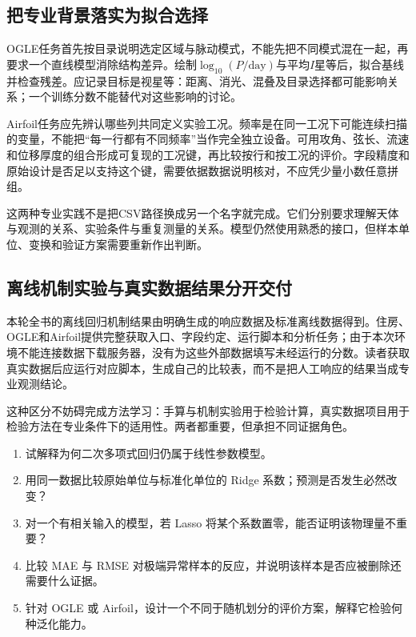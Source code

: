 
\subsection{把专业背景落实为拟合选择}
OGLE任务首先按目录说明选定区域与脉动模式，不能先把不同模式混在一起，再要求一个直线模型消除结构差异。绘制$\log_{10}(P/\mathrm{day})$与平均$I$星等后，拟合基线并检查残差。应记录目标是视星等：距离、消光、混叠及目录选择都可能影响关系；一个训练分数不能替代对这些影响的讨论。

Airfoil任务应先辨认哪些列共同定义实验工况。频率是在同一工况下可能连续扫描的变量，不能把“每一行都有不同频率”当作完全独立设备。可用攻角、弦长、流速和位移厚度的组合形成可复现的工况键，再比较按行和按工况的评价。字段精度和原始设计是否足以支持这个键，需要依据数据说明核对，不应凭少量小数任意拼组。

这两种专业实践不是把CSV路径换成另一个名字就完成。它们分别要求理解天体与观测的关系、实验条件与重复测量的关系。模型仍然使用熟悉的接口，但样本单位、变换和验证方案需要重新作出判断。

\subsection{离线机制实验与真实数据结果分开交付}
本轮全书的离线回归机制结果由明确生成的响应数据及标准离线数据得到。住房、OGLE和Airfoil提供完整获取入口、字段约定、运行脚本和分析任务；由于本次环境不能连接数据下载服务器，没有为这些外部数据填写未经运行的分数。读者获取真实数据后应运行对应脚本，生成自己的比较表，而不是把人工响应的结果当成专业观测结论。

这种区分不妨碍完成方法学习：手算与机制实验用于检验计算，真实数据项目用于检验方法在专业条件下的适用性。两者都重要，但承担不同证据角色。

\chapterexercise
\begin{enumerate}
\item 试解释为何二次多项式回归仍属于线性参数模型。
\item 用同一数据比较原始单位与标准化单位的 Ridge 系数；预测是否发生必然改变？
\item 对一个有相关输入的模型，若 Lasso 将某个系数置零，能否证明该物理量不重要？
\item 比较 MAE 与 RMSE 对极端异常样本的反应，并说明该样本是否应被删除还需要什么证据。
\item 针对 OGLE 或 Airfoil，设计一个不同于随机划分的评价方案，解释它检验何种泛化能力。
\end{enumerate}

